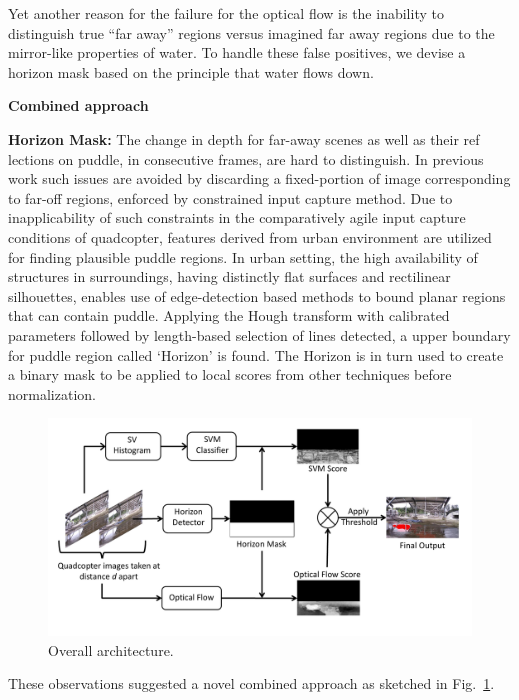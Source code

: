 \documentclass[11pt]{article}
\begin{document}
Yet another reason for the failure for the optical flow is the
inability to distinguish true ``far away'' regions versus imagined far
away regions due to the mirror-like properties of water.  To handle
these false positives, we devise a horizon mask based on the principle
that water flows down.
\vspace{0.5cm}

\noindent\textbf{Combined approach}

\textbf{Horizon Mask:} The change in depth for far-away scenes as well
as their ref	lections on puddle, in consecutive frames, are hard to
distinguish. In previous work \cite{rankin11} such issues are avoided
by discarding a fixed-portion of image corresponding to far-off
regions, enforced by constrained input capture method. Due to
inapplicability of such constraints in the comparatively agile input
capture conditions of quadcopter, features derived from urban
environment are utilized for finding plausible puddle regions. In
urban setting, the high availability of structures in surroundings,
having distinctly flat surfaces and rectilinear silhouettes, enables
use of edge-detection based methods to bound planar regions that can
contain puddle. Applying the Hough transform with calibrated
parameters followed by length-based selection of lines detected, a
upper boundary for puddle region called `Horizon' is found. The
Horizon is in turn used to create a binary mask to be applied to local
scores from other techniques before normalization.

\begin{figure}[h!]
  \centering
  \includegraphics[width=\textwidth]{stagnantWater/figures/overall_workflow.pdf}
  \caption{Overall architecture.}
  \label{fig:workflow}
\end{figure}

These observations suggested a novel combined approach as sketched
in Fig.~\ref{fig:workflow}.
\end{document}
